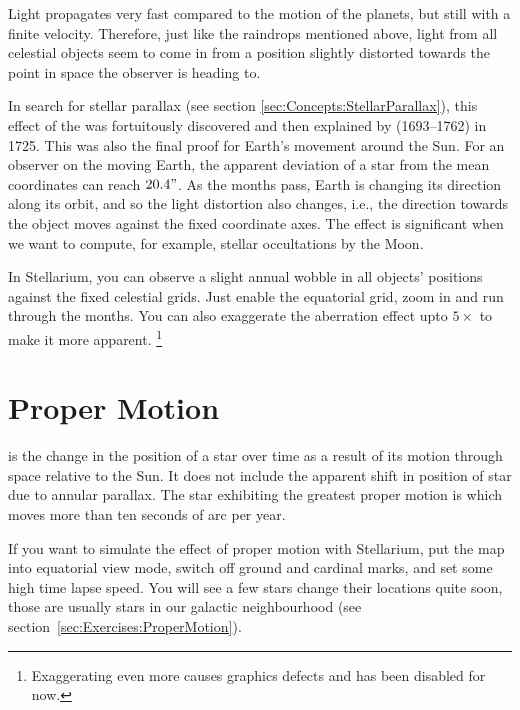 Light propagates very fast compared to the motion of the planets, but
still with a finite velocity. Therefore, just like the raindrops
mentioned above, light from all celestial objects seem to come in from
a position slightly distorted towards the point in space the observer
is heading to.

In search for stellar parallax (see section \ref{sec:Concepts:StellarParallax}),
this effect of the  was fortuitously
discovered and then explained by  (1693--1762) in
1725. This was also the final proof for Earth's movement around the
Sun. For an observer on the moving Earth, the apparent deviation of a
star from the mean coordinates can reach $20.4"$. As the months pass,
Earth is changing its direction along its orbit, and so the light
distortion also changes, i.e., the direction towards the object moves
against the fixed coordinate axes. The effect is significant when we
want to compute, for example, stellar occultations by the Moon.

In Stellarium, you can observe a slight annual wobble in all objects'
positions against the fixed celestial grids. Just enable the
equatorial grid, zoom in and run through the months. You can also
exaggerate the aberration effect upto $5\times$ to make it more
apparent. \footnote{Exaggerating even more causes graphics defects and
  has been disabled for now.}

\section{Proper Motion}
\label{sec:Concepts:ProperMotion}

 is the change in the position of a star over time as a
result of its motion through space relative to the Sun. It does not
include the apparent shift in position of star due to annular parallax.
The star exhibiting the greatest proper motion is  which
moves more than ten seconds of arc per year.

If you want to simulate the effect of proper motion with Stellarium,
put the map into equatorial view mode, switch off ground and cardinal
marks, and set some high time lapse speed. You will see a few stars
change their locations quite soon, those are usually stars in our
galactic neighbourhood (see section~\ref{sec:Exercises:ProperMotion}).

